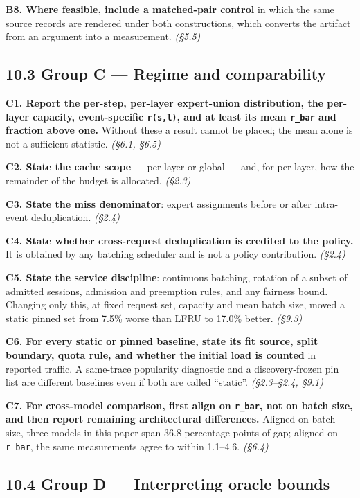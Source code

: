 \documentclass[
  10pt,
  letterpaper,
  10pt]{article}
\begin{document}
\textbf{B8. Where feasible, include a matched-pair control} in which the
same source records are rendered under both constructions, which
converts the artifact from an argument into a measurement. \emph{(§5.5)}

\subsection{10.3 Group C --- Regime and
comparability}\label{group-c-regime-and-comparability}

\textbf{C1. Report the per-step, per-layer expert-union distribution,
the per-layer capacity, event-specific \texttt{r(s,l)}, and at least its
mean \texttt{r\_bar} and fraction above one.} Without these a result
cannot be placed; the mean alone is not a sufficient statistic.
\emph{(§6.1, §6.5)}

\textbf{C2. State the cache scope} --- per-layer or global --- and, for
per-layer, how the remainder of the budget is allocated. \emph{(§2.3)}

\textbf{C3. State the miss denominator}: expert assignments before or
after intra-event deduplication. \emph{(§2.4)}

\textbf{C4. State whether cross-request deduplication is credited to the
policy.} It is obtained by any batching scheduler and is not a policy
contribution. \emph{(§2.4)}

\textbf{C5. State the service discipline}: continuous batching, rotation
of a subset of admitted sessions, admission and preemption rules, and
any fairness bound. Changing only this, at fixed request set, capacity
and mean batch size, moved a static pinned set from 7.5\% worse than
LFRU to 17.0\% better. \emph{(§9.3)}

\textbf{C6. For every static or pinned baseline, state its fit source,
split boundary, quota rule, and whether the initial load is counted} in
reported traffic. A same-trace popularity diagnostic and a
discovery-frozen pin list are different baselines even if both are
called ``static''. \emph{(§2.3--§2.4, §9.1)}

\textbf{C7. For cross-model comparison, first align on \texttt{r\_bar},
not on batch size, and then report remaining architectural differences.}
Aligned on batch size, three models in this paper span 36.8 percentage
points of gap; aligned on \texttt{r\_bar}, the same measurements agree
to within 1.1--4.6. \emph{(§6.4)}

\subsection{10.4 Group D --- Interpreting oracle
bounds}\label{group-d-interpreting-oracle-bounds}
\end{document}
